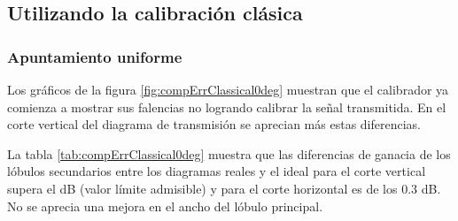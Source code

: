 \subsection{Utilizando la calibración clásica}

\subsubsection{Apuntamiento uniforme}

Los gráficos de la figura \ref{fig:compErrClassical0deg} muestran que el calibrador ya comienza a mostrar sus falencias no 
logrando calibrar la señal transmitida. En el corte vertical del diagrama de transmisión se aprecian más estas diferencias.

La tabla \ref{tab:compErrClassical0deg} muestra que las diferencias de ganacia de los lóbulos secundarios entre los diagramas 
reales y el ideal para el corte vertical supera el dB (valor límite admisible) y para el corte horizontal es de los 0.3 dB. No 
se aprecia una mejora en el ancho del lóbulo principal.
